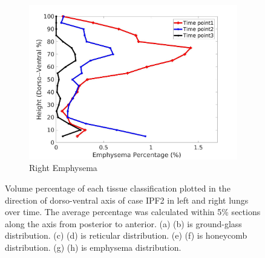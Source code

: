 \begin{figure}[H]
\begin{subfigure}{.4\linewidth}
  \includegraphics[width=\linewidth,trim={{.0\wd0} {.0\wd0} {.0\wd0} {.0\wd0}},clip]{Appendix/Image_AppexA/DorsoToVentral/IPF2RightLungEmphysemaDiseaseDorsoToVentral.jpg}
  \caption{Right Emphysema}
  \label{fig:IPF2DiseaseDorsoToVentral-h}
\end{subfigure}
\caption{Volume percentage of each tissue classification plotted in the direction of dorso-ventral axis of case IPF2 in left and right lungs over time. The average percentage was calculated within 5\% sections along the axis from posterior to anterior. (a) (b) is ground-glass distribution. (c) (d) is reticular distribution. (e) (f) is honeycomb distribution. (g) (h) is emphysema distribution.}
\label{fig:IPF2DiseaseDorsoToVentral}
\end{figure}

